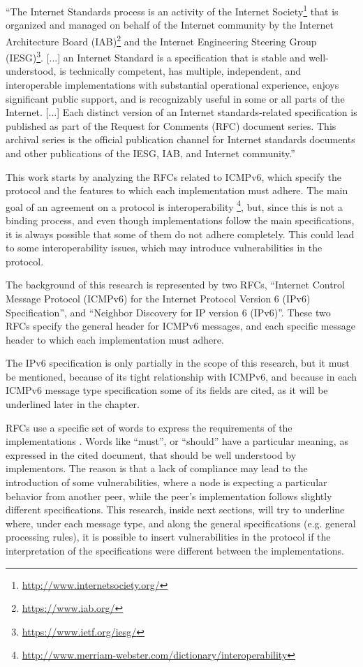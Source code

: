 \documentclass[12pt]{article}
\begin{document}
``The Internet Standards process is an activity of the Internet Society\footnote{\url{http://www.internetsociety.org/}} that is organized and managed on behalf of the Internet community by the Internet Architecture Board (IAB)\footnote{\url{https://www.iab.org/}} and the Internet Engineering Steering Group (IESG)\footnote{\url{https://www.ietf.org/iesg/}}. [...] an Internet Standard is a specification that is stable and well-understood, is technically competent, has multiple, independent, and interoperable implementations with substantial operational experience, enjoys significant public support, and is recognizably useful in some or all parts of the Internet. [...] Each distinct version of an Internet standards-related specification is published as part of the Request for Comments (RFC) document series.  This archival series is the official publication channel for Internet standards documents and other publications of the IESG, IAB, and Internet community.''\cite{rfc2026}

This work starts by analyzing the RFCs related to ICMPv6, which specify the protocol and the features to which each implementation must adhere. The main goal of an agreement on a protocol is interoperability \footnote{\url{http://www.merriam-webster.com/dictionary/interoperability}}, but, since this is not a binding process, and even though implementations follow the main specifications, it is always possible that some of them do not adhere completely. This could lead to some interoperability issues, which may introduce vulnerabilities in the protocol.

The background of this research is represented by two RFCs, ``Internet Control Message Protocol (ICMPv6) for the Internet Protocol Version 6 (IPv6) Specification''\cite{rfc4443}, and ``Neighbor Discovery for IP version 6 (IPv6)''\cite{rfc4861}. These two RFCs specify the general header for ICMPv6 messages, and each specific message header to which each implementation must adhere.

The IPv6 specification\cite{rfc2460} is only partially in the scope of this research, but it must be mentioned, because of its tight relationship with ICMPv6, and because in each ICMPv6 message type specification some of its fields are cited, as it will be underlined later in the chapter.

RFCs use a specific set of words to express the requirements of the implementations \cite{rfc2119}. Words like ``must'', or ``should'' have a particular meaning, as expressed in the cited document, that should be well understood by implementors. The reason is that a lack of compliance may lead to the introduction of some vulnerabilities, where a node is expecting a particular behavior from another peer, while the peer's implementation follows slightly different specifications. This research, inside next sections, will try to underline where, under each message type, and along the general specifications (e.g. general processing rules), it is possible to insert vulnerabilities in the protocol if the interpretation of the specifications were different between the implementations.
\end{document}
